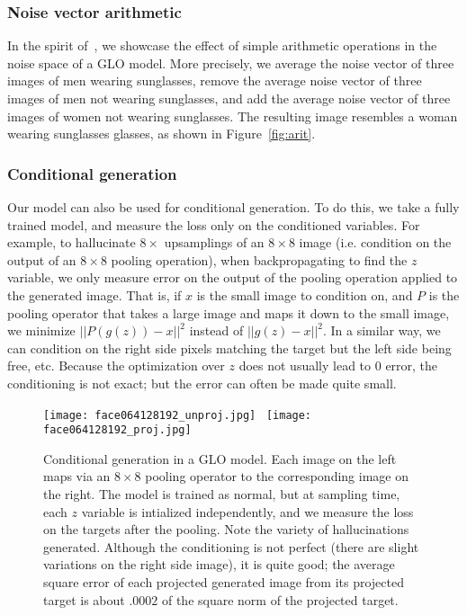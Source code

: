 \documentclass{article}
\newcommand{\GNAT}{GLO}
\begin{document}
\subsubsection{Noise vector arithmetic}\label{sec:experiments:arithmetic}

In the spirit of~\cite{dcgan}, we showcase the effect of simple arithmetic operations in the noise space of a \GNAT{} model.
More precisely, we average the noise vector of three images of men wearing
sunglasses, remove the average noise vector of three images of men not wearing
sunglasses, and add the average noise vector of three images of women not
wearing sunglasses. The resulting image resembles a woman wearing sunglasses
glasses, as shown in Figure~\ref{fig:arit}.

\subsubsection{Conditional generation}\label{sec:experiments:conditional}
Our model can also be used for conditional generation.  To do this, we take a
fully trained model, and measure the loss only on the conditioned variables.
For example, to hallucinate $8\times$ upsamplings of an $8\times 8$ image (i.e.
condition on the output of an $8\times 8$ pooling operation), when
backpropagating to find the $z$ variable, we only measure error on the output
of the pooling operation applied to the generated image.   That is, if $x$ is
the small image to condition on, and $P$ is the pooling operator that takes a
large image and maps it down to the small image, we minimize $||P(g(z))-x||^2$
instead of  $||g(z)-x||^2$.  In a similar way, we can condition on the right
side pixels matching the target but the left side being free, etc.  Because the
optimization over $z$ does not usually lead to $0$ error, the conditioning is
not exact; but the error can often be made quite small.

\begin{figure}
  \begin{center}
  \texttt{[image: face064128192\_unproj.jpg]} \  \texttt{[image: face064128192\_proj.jpg]} \\
  \end{center}
  \caption{
  Conditional generation in a  \GNAT{} model.  Each image on the left maps via
  an $8\times 8$ pooling operator to the corresponding image on the right.  The
  model is trained as normal, but at sampling time, each $z$ variable is
  intialized independently, and we measure the loss on the targets after the
  pooling.  Note the variety of hallucinations generated.   Although the
  conditioning is not perfect (there are slight variations on the right side
  image), it is quite good; the average square error of each projected
  generated image from its projected target is about $.0002$ of the square norm of the projected target.
  \label{fig:cond}}
\end{figure}
\end{document}
